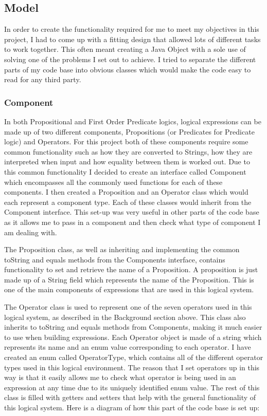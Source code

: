 \subsection{Model}
In order to create the functionality required for me to meet my objectives in this project, I had to come up with a fitting design that allowed lots of different tasks to work together. This often meant creating a Java Object with a sole use of solving one of the problems I set out to achieve. I tried to separate the different parts of my code base into obvious classes which would make the code easy to read for any third party.

\subsubsection{Component}
In both Propositional and First Order Predicate logics, logical expressions can be made up of two different components, Propositions (or Predicates for Predicate logic) and Operators. For this project both of these components require some common functionality such as how they are converted to Strings, how they are interpreted when input and how equality between them is worked out. Due to this common functionality I decided to create an interface called Component which encompasses all the commonly used functions for each of these components. I then created a Proposition and an Operator class which would each represent a component type. Each of these classes would inherit from the Component interface. This set-up was very useful in other parts of the code base as it allows me to pass in a component and then check what type of component I am dealing with.  

The Proposition class, as well as inheriting and implementing the common toString and equals methods from the Components interface, contains functionality to set and retrieve the name of a Proposition. A proposition is just made up of a String field which represents the name of the Proposition. This is one of the main components of expressions that are used in this logical system.

The Operator class is used to represent one of the seven operators used in this logical system, as described in the Background section above. This class also inherits to toString and equals methods from Components, making it much easier to use when building expressions. Each Operator object is made of a string which represents its name and an enum value corresponding to each operator. I have created an enum called OperatorType, which contains all of the different operator types used in this logical environment. The reason that I set operators up in this way is that it easily allows me to check what operator is being used in an expression at any time due to its uniquely identified enum value. The rest of this class is filled with getters and setters that help with the general functionality of this logical system. Here is a diagram of how this part of the code base is set up:

